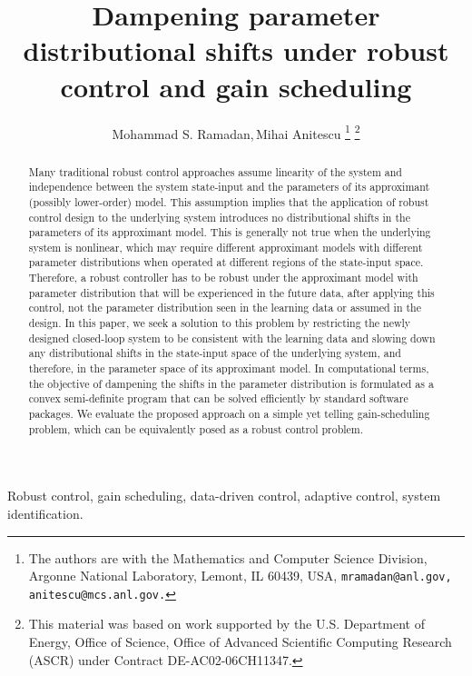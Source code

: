 \documentclass[letterpaper, 10 pt, conference]{ieeeconf}
\title{\Large \bf Dampening parameter distributional shifts under robust control and gain scheduling}
\author{Mohammad S. Ramadan,\,Mihai Anitescu
\thanks{The authors are with the Mathematics and Computer Science Division, Argonne National Laboratory, Lemont, IL 60439, USA,  {\tt\footnotesize mramadan@anl.gov, anitescu@mcs.anl.gov.}}
\thanks{This material was based on work
supported by the U.S. Department of Energy, Office of Science,
Office of Advanced Scientific Computing Research (ASCR) under
Contract DE-AC02-06CH11347. }
}
\begin{document}
\maketitle


\begin{abstract} 
Many traditional robust control approaches assume linearity of the system and independence between the system state-input and the parameters of its approximant (possibly lower-order) model. This assumption implies that the application of robust control design to the underlying system introduces no distributional shifts in the parameters of its approximant model. This is generally not true when the underlying system is nonlinear, which may require different approximant models with different parameter distributions when operated at different regions of the state-input space. Therefore, a robust controller has to be robust under the approximant model with parameter distribution that will be experienced in the future data, after applying this control, not the parameter distribution seen in the learning data or assumed in the design. In this paper, we seek a solution to this problem by restricting the newly designed closed-loop system to be consistent with the learning data and slowing down any distributional shifts in the state-input space of the underlying system, and therefore, in the parameter space of its approximant model. In computational terms, the objective of dampening the shifts in the parameter distribution is formulated as a convex semi-definite program that can be solved efficiently by standard software packages. We evaluate the proposed approach on a simple yet telling gain-scheduling problem, which can be equivalently posed as a robust control problem.
\end{abstract}

\begin{keywords}
Robust control, gain scheduling, data-driven control, adaptive control, system identification.
\end{keywords}
\end{document}

